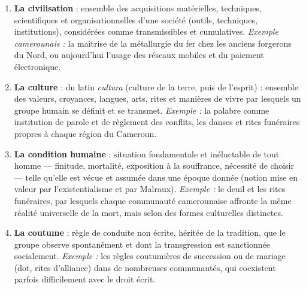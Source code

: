 \documentclass[11pt]{article}
\begin{document}
\begin{corrige}
\begin{enumerate}
\item \textbf{La civilisation} : ensemble des acquisitions matérielles, techniques, scientifiques et organisationnelles d'une société (outils, techniques, institutions), considérées comme transmissibles et cumulatives. \emph{Exemple camerounais :} la maîtrise de la métallurgie du fer chez les anciens forgerons du Nord, ou aujourd'hui l'usage des réseaux mobiles et du paiement électronique.

\item \textbf{La culture} : du latin \emph{cultura} (culture de la terre, puis de l'esprit) : ensemble des valeurs, croyances, langues, arts, rites et manières de vivre par lesquels un groupe humain se définit et se transmet. \emph{Exemple :} la palabre comme institution de parole et de règlement des conflits, les danses et rites funéraires propres à chaque région du Cameroun.

\item \textbf{La condition humaine} : situation fondamentale et inéluctable de tout homme — finitude, mortalité, exposition à la souffrance, nécessité de choisir — telle qu'elle est vécue et assumée dans une époque donnée (notion mise en valeur par l'existentialisme et par Malraux). \emph{Exemple :} le deuil et les rites funéraires, par lesquels chaque communauté camerounaise affronte la même réalité universelle de la mort, mais selon des formes culturelles distinctes.

\item \textbf{La coutume} : règle de conduite non écrite, héritée de la tradition, que le groupe observe spontanément et dont la transgression est sanctionnée socialement. \emph{Exemple :} les règles coutumières de succession ou de mariage (dot, rites d'alliance) dans de nombreuses communautés, qui coexistent parfois difficilement avec le droit écrit.
\end{enumerate}
\end{corrige}
\end{document}
